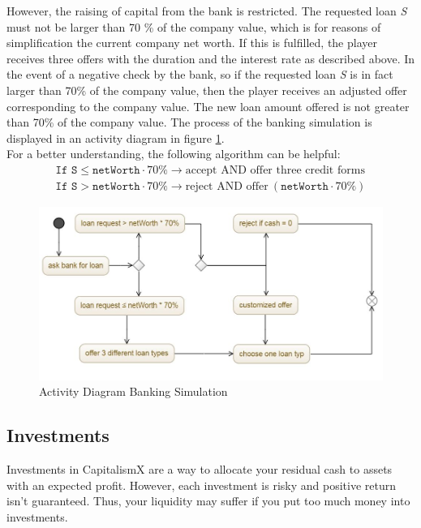 However, the raising of capital from the bank is restricted.
The requested loan \textit{S} must not be larger than 70 \% of the company value, which is for reasons of simplification the current company net worth. If this is fulfilled, the player receives three offers with the duration and the interest rate as described above. In the event of a negative check by the bank, so if the requested loan \textit{S} is in fact larger than 70\% of the company value, then the player receives an adjusted offer corresponding to the company value. The new loan amount offered is not greater than 70\% of the company value. The process of the banking simulation is displayed in an activity diagram in figure \ref{jpg:banking}.\\
For a better understanding, the following algorithm can be helpful:
\begin{equation}
    \begin{aligned}
         \texttt{If S} \leq \texttt{netWorth} \cdot 70\%  \xrightarrow{} \text{accept AND offer three credit forms} \\
         \texttt{If S} > \texttt{netWorth} \cdot 70\%  \xrightarrow{} \text{reject AND offer} \ (\texttt{netWorth} \cdot 70\%)
    \end{aligned}    
\end{equation}

\begin{figure}
	\centering
	\includegraphics[width=12cm]{images/activity_diagram.JPG}
	\caption{Activity Diagram Banking Simulation}
	\label{jpg:banking}
\end{figure}


\subsection{Investments}
\label{sec:investments_simulation}

 Investments in CapitalismX are a way to allocate your residual cash to assets with an expected profit. However, each investment is risky and positive return isn't guaranteed. Thus, your liquidity may suffer if you put too much money into investments.
  
